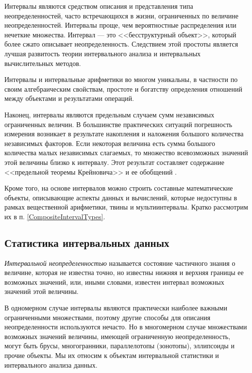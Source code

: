 \documentclass[a5paper,openany]{book}
\begin{document}
{Интервалы являются средством описания и представления типа неопределенностей, часто встречающихся в жизни, ограниченных 
по величине неопределенностей. Интервалы проще, чем вероятностные распределения или 
нечеткие множества. 
Интервал --- это <<бесструктурный объект>>, который более сжато описывает неопределенность.
Следствием этой простоты является лучшая развитость теории 
интервального анализа и интервальных вычислительных методов. 

Интервалы и интервальные арифметики во многом уникальны, в частности по своим алгебраическим свойствам, простоте и богатству определения отношений между объектами и результатами операций.

Наконец, интервалы являются предельным случаем сумм независимых ограниченных величин. 
В большинстве практических ситуаций погрешность измерения возникает в результате 
накопления и наложения большого количества независимых факторов. 
Если некоторая величина есть сумма большого количества малых независимых слагаемых, 
то множество всевозможных значений этой величины близко к интервалу.
Этот результат составляет содержание <<предельной 
теоремы Крейновича>> и ее обобщений \cite{SSharyBook}.

Кроме того, на основе интервалов можно строить составные математические объекты, описывающие аспекты данных и вычислений, которые недоступны в рамках вещественной арифметики, твины и мультиинтервалы. Кратко рассмотрим их в п. \ref{CompositeIntervalTypes}.

\subsection{Статистика интервальных данных} 
\label{InteStatistiSect}    


\textit{Интервальной неопределенностью} называется состояние частичного знания 
о величине, которая не известна точно, но известны нижняя и верхняя границы ее возможных 
значений, или, иными словами, известен интервал 
возможных значений этой величины. 

В одномерном случае интервалы являются практически наиболее важными ограниченными 
множествами, поэтому другие способы для описания неопределенности используются нечасто. Но 
в многомерном случае множествами возможных значений величины, имеющей ограниченную 
неопределенность, могут быть брусы, многогранники, параллелотопы (зонотопы), 
эллипсоиды и прочие объекты. Мы их  относим к объектам интервальной 
статистики и интервального анализа данных. 

}
\end{document}

